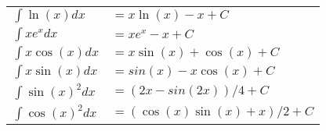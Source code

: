 \begin{table}[H]
\centering
\begin{tabular}{p{2cm}p{4cm}}
$\int \ln(x) dx$ & $=x\ln(x)-x+C$ \\
$\int x e^x dx$ & $=x e^x-x+C$ \\
$\int x \cos(x) dx$ & $=x\sin(x)+\cos(x)+C$ \\
$\int x \sin(x) dx$ & $=sin(x)-x\cos(x)+C$ \\
$\int \sin(x)^2 dx$ & $=(2x-sin(2x))/4+C$ \\
$\int \cos(x)^2 dx$ & $=(\cos(x)\sin(x)+x)/2+C$ \\
\end{tabular}
\end{table}
